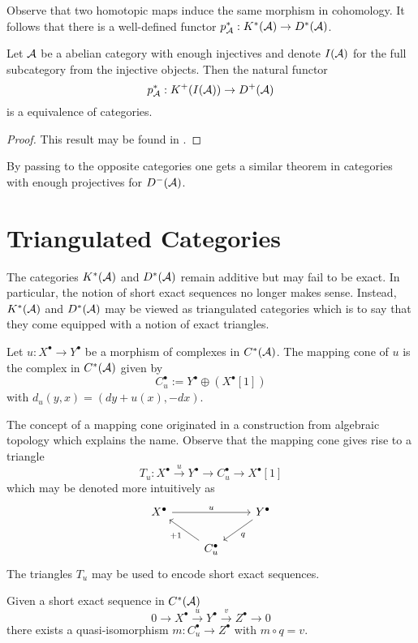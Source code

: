 Observe that two homotopic maps induce the same morphism in cohomology.
It follows that there is a well-defined functor $p_\AA^*:K^*(\AA)\to D^*(\AA)$.
\begin{proposition}\label{prop: DerivedCategoryInjectives}
 Let $\AA$ be a abelian category with enough injectives and denote $I(\AA)$ for the full subcategory from the injective objects.
 Then the natural functor
 $$p_\AA^*: K^+(I(\AA))\to D^+(\AA) $$
 is a equivalence of categories.
\end{proposition}
\begin{proof}
  This result may be found in \cite[Chapter 1]{dimca2004sheaves}.
\end{proof}
By passing to the opposite categories one gets a similar theorem in categories with enough projectives for $D^-(\AA)$.
\section{Triangulated Categories}
The categories $K^*(\AA)$ and $D^*(\AA)$ remain additive but may fail to be exact.
In particular, the notion of short exact sequences no longer makes sense.
Instead, $K^*(\AA)$ and $D^*(\AA)$ may be viewed as triangulated categories which is to say that they come equipped with a notion of exact triangles.
\begin{definition}
 Let $u:X^\bullet \to Y^\bullet$ be a morphism of complexes in $C^*(\AA)$.
 The mapping cone of $u$ is the complex in $C^*(\AA)$ given by
 $$C_u^\bullet := Y^\bullet \oplus (X^\bullet[1]) $$
 with $d_u(y,x)= (dy + u(x) , -dx)$.
\end{definition}
The concept of a mapping cone originated in a construction from algebraic topology which explains the name.
Observe that the mapping cone gives rise to a triangle
$$T_u:X^\bullet \xrightarrow{u} Y^\bullet \to C_u^\bullet \to X^\bullet[1]$$
which may be denoted more intuitively as
$$
 \begin{tikzcd}
   X^\bullet \arrow{rr}{u}& & Y^\bullet \arrow{dl}{q}\\
   & C_u^\bullet\arrow{lu}{+1}
 \end{tikzcd}
$$
The triangles $T_u$ may be used to encode short exact sequences.
\begin{proposition}\label{prop: SESYieldsTriangle}
Given a short exact sequence in $C^*(\AA)$
$$0 \to X^\bullet \xrightarrow{u} Y^\bullet \xrightarrow{v} Z^\bullet \to 0 $$
there exists a quasi-isomorphism $m:C_u^\bullet \to Z^\bullet$ with $m\circ q = v$.
\end{proposition}
